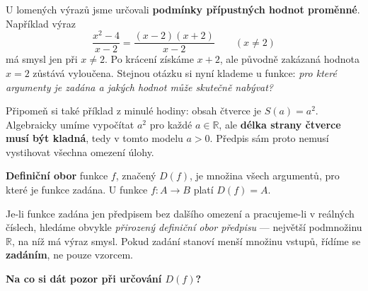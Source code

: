 \documentclass[11pt,a4paper]{article}
\begin{document}

U lomených výrazů jsme určovali \textbf{podmínky přípustných hodnot
proměnné}. Například výraz
\[
\frac{x^2-4}{x-2}=\frac{(x-2)(x+2)}{x-2}\qquad (x\ne2)
\]
má smysl jen při $x\ne2$. Po krácení získáme $x+2$, ale původně
zakázaná hodnota $x=2$ zůstává vyloučena. Stejnou otázku si nyní
klademe u funkce: \emph{pro které argumenty je zadána a jakých hodnot
může skutečně nabývat?}

Připomeň si také příklad z minulé hodiny: obsah čtverce je
$S(a)=a^2$. Algebraicky umíme vypočítat $a^2$ pro každé $a\in\mathbb R$,
ale \textbf{délka strany čtverce musí být kladná}, tedy v tomto modelu
$a>0$. Předpis sám proto nemusí vystihovat všechna omezení úlohy.

\begin{definiceBox}[title={Definice - Definiční obor funkce}]
\textbf{Definiční obor} funkce $f$, značený $D(f)$, je množina všech
argumentů, pro které je funkce zadána. U funkce $f\colon A\to B$
platí $D(f)=A$.
\end{definiceBox}

Je-li funkce zadána jen předpisem bez dalšího omezení a pracujeme-li
v reálných číslech, hledáme obvykle \emph{přirozený definiční obor
předpisu} — největší podmnožinu $\mathbb R$, na níž má výraz smysl.
Pokud zadání stanoví menší množinu vstupů, řídíme se \textbf{zadáním},
ne pouze vzorcem.

\medskip
\textbf{Na co si dát pozor při určování $D(f)$?}
\end{document}
